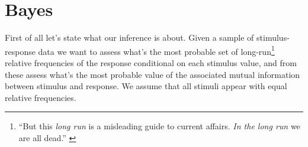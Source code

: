 \documentclass[\ifafour a4paper,12pt,\else a5paper,10pt,\fi%
onecolumn,oneside,article,%
british%
]{memoir}
\theoremstyle{remark}
\theoremstyle{innote}
\newcommand*{\citep}{\parencites}
\renewcommand*{\|}{\nonscript\,\vert\nonscript\;\mathopen{}}
\newcommand*{\sect}{\S}%
\newcommand*{\puzzle}{{\fontencoding{U}\fontfamily{fontawesometwo}\selectfont\symbol{225}}}
\newcommand{\mynote}[1]{ {\color{notecolour}\puzzle\ #1}}
\begin{document}



\section{Bayes}
\label{sec:bias_bayes}

First of all let's state what our inference is about. Given a sample of
stimulus-response data we want to assess what's the most probable set of
long-run\footnote{\enquote{But this \emph{long run} is a misleading guide
    to current affairs. \emph{In the long run} we are all dead.}
  \citep[\sect~3.I, p.~65]{keynes1923_r2013}} relative frequencies of the
response conditional on each stimulus value, and from these assess what's
the most probable value of the associated mutual information between
stimulus and response. We assume that all stimuli appear with equal
relative frequencies.
\end{document}
